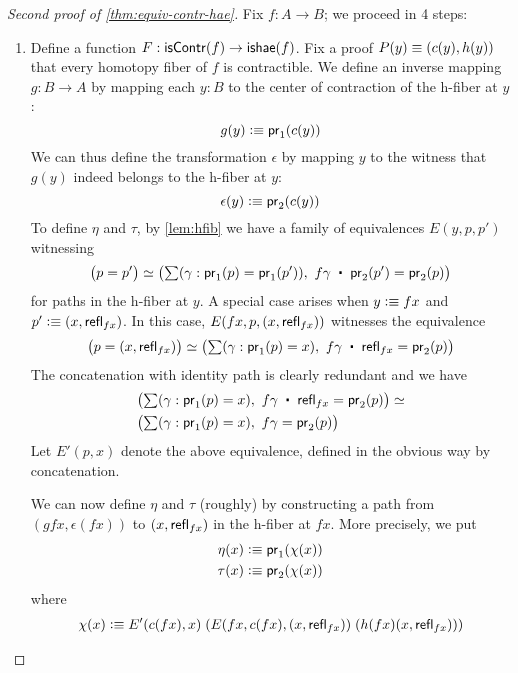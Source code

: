 \begin{proof}[Second proof of \autoref{thm:equiv-contr-hae}]
Fix $f:A\to B$; we proceed in 4 steps:
\begin{enumerate}
\item Define a function $F : \mathsf{isContr}(f) \to \mathsf{ishae}(f)$. Fix a proof $P(y) \equiv (c(y), h(y))$ that every homotopy fiber of $f$ is contractible.
We define an inverse mapping $g : B \to A$ by mapping each $y : B$ to the center of contraction of the h-fiber at $y$:
\[ g(y) \vcentcolon\equiv \mathsf{pr}_{1}(c(y)) \]
We can thus define the transformation $\epsilon$ by mapping $y$ to the witness that $g(y)$ indeed belongs to the h-fiber at $y$:
\[ \epsilon(y) \vcentcolon\equiv \mathsf{pr}_{2}(c(y)) \]
To define $\eta$ and $\tau$, by \autoref{lem:hfib} we have a family of equivalences $E(y,p,p')$ witnessing
\[ \big( p = p' \big) \simeq \big( \sm{\gamma : \proj{1}(p) = \proj{1}(p')} f\gamma \; \ct \; \proj{2}(p') = \proj{2}(p) \big) \]
for paths in the h-fiber at $y$. A special case arises when $y \vcentcolon\equiv fx$ and $p' \vcentcolon\equiv (x,\mathsf{refl}_{fx})$. In this case,
$E(fx,p,(x,\mathsf{refl}_{fx}))$ witnesses the equivalence
\[ \big( p = (x,\refl{fx}) \big) \simeq \big( \sm{\gamma : \proj{1}(p) = x} f\gamma \; \ct \; \refl{fx} = \proj{2}(p) \big) \]
The concatenation with identity path is clearly redundant and we have
\begin{align*}
& \big( \sm{\gamma : \proj{1}(p) = x} f\gamma \; \ct \; \refl{fx} = \proj{2}(p) \big) \simeq \\ 
& \big( \sm{\gamma : \proj{1}(p) = x} f\gamma = \proj{2}(p) \big)
\end{align*}
Let $E'(p,x)$ denote the above equivalence, defined in the obvious way by concatenation.

We can now define $\eta$ and $\tau$ (roughly) by constructing a path from $(gfx,\epsilon(fx))$ to $(x,\mathsf{refl}_{fx})$ in the h-fiber at $fx$. More precisely, we put
\begin{align*}
\eta(x) & \vcentcolon\equiv \mathsf{pr}_{1} (\chi(x)) \\
\tau(x) & \vcentcolon\equiv \mathsf{pr}_{2} (\chi(x))
\end{align*}
where
\begin{align*} \chi(x) \vcentcolon\equiv E'(c(fx), x) \; (E(fx, c(fx), (x,\mathsf{refl}_{fx})) \; (h(fx)(x, \mathsf{refl}_{fx}))) \end{align*}


\end{enumerate}
\end{proof}
